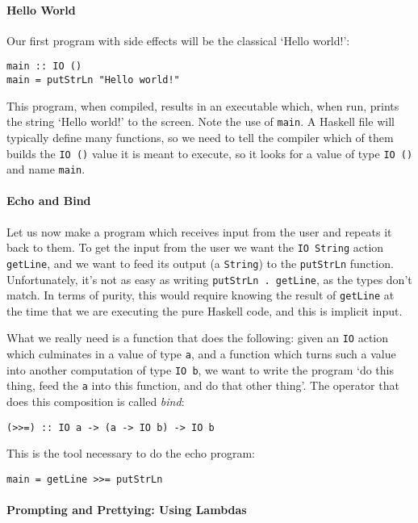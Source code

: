 \documentclass[11	pt]{article}
\theoremstyle{nonumberplain}
\newcommand*\lsin{\lstinline}
\begin{document}
\paragraph{Hello World}
Our first program with side effects will be the classical `Hello world!':
\begin{lstlisting}
main :: IO ()
main = putStrLn "Hello world!"
\end{lstlisting}

This program, when compiled, results in an executable which, when run, prints the string `Hello world!' to the screen. Note the use of \lsin|main|. A Haskell file will typically define many functions, so we need to tell the compiler which of them builds the \lsin|IO ()| value it is meant to execute, so it looks for a value of type \lsin|IO ()| and name \lsin|main|.

\paragraph{Echo and Bind}
Let us now make a program which receives input from the user and repeats it back to them. To get the input from the user we want the \mbox{\lsin|IO String|} action \lsin|getLine|, and we want to feed its output (a \lsin|String|) to the \lsin|putStrLn| function. Unfortunately, it's not as easy as writing \lsin|putStrLn . getLine|, as the types don't match. In terms of purity, this would require knowing the result of \lsin|getLine| at the time that we are executing the pure Haskell code, and this is implicit input.

What we really need is a function that does the following: given an \lsin|IO| action which culminates in a value of type \lsin|a|, and a function which turns such a value into another computation of type \lsin|IO b|, we want to write the program `do this thing, feed the \lsin|a| into this function, and do that other thing'. The operator that does this composition is called \emph{bind}:
\begin{lstlisting}
(>>=) :: IO a -> (a -> IO b) -> IO b
\end{lstlisting}

This is the tool necessary to do the echo program:
\begin{lstlisting}
main = getLine >>= putStrLn
\end{lstlisting}

\paragraph{Prompting and Prettying: Using Lambdas}
\end{document}
